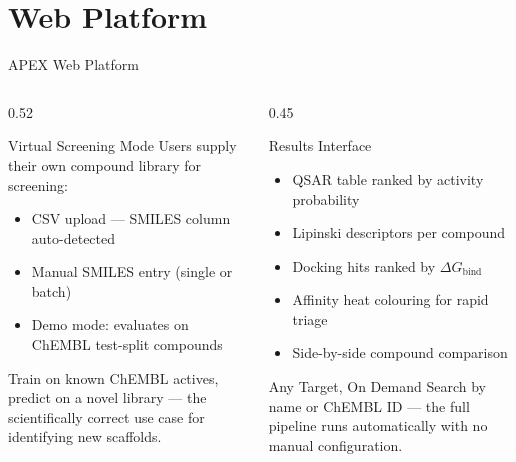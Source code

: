 \section{Web Platform}

\begin{frame}{APEX Web Platform}
  \begin{columns}[T]
    \begin{column}{0.52\textwidth}
      \begin{block}{Virtual Screening Mode}
        Users supply their own compound library for screening:
        \begin{itemize}
          \item CSV upload — SMILES column auto-detected
          \item Manual SMILES entry (single or batch)
          \item Demo mode: evaluates on ChEMBL test-split compounds
        \end{itemize}
        \vspace{0.15cm}
        Train on known ChEMBL actives, predict on a novel
        library — the scientifically correct use case for
        identifying new scaffolds.
      \end{block}
    \end{column}
    \begin{column}{0.45\textwidth}
      \begin{block}{Results Interface}
        \begin{itemize}
          \item QSAR table ranked by activity probability
          \item Lipinski descriptors per compound
          \item Docking hits ranked by $\Delta G_{\text{bind}}$
          \item Affinity heat colouring for rapid triage
          \item Side-by-side compound comparison
        \end{itemize}
      \end{block}
      \vspace{0.2cm}
      \begin{exampleblock}{Any Target, On Demand}
        Search by name or ChEMBL ID — the full pipeline
        runs automatically with no manual configuration.
      \end{exampleblock}
    \end{column}
  \end{columns}
\end{frame}
